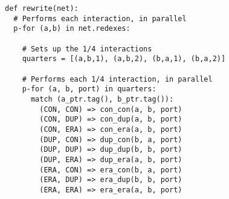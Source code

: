 \documentclass{article}
\begin{document}
\begin{lstlisting}
def rewrite(net):
  # Performs each interaction, in parallel
  p-for (a,b) in net.redexes:

    # Sets up the 1/4 interactions
    quarters = [(a,b,1), (a,b,2), (b,a,1), (b,a,2)]

    # Performs each 1/4 interaction, in parallel
    p-for (a, b, port) in quarters:
      match (a_ptr.tag(), b_ptr.tag()):
        (CON, CON) => con_con(a, b, port)
        (CON, DUP) => con_dup(a, b, port)
        (CON, ERA) => con_era(a, b, port)
        (DUP, CON) => dup_con(b, a, port)
        (DUP, DUP) => dup_dup(b, b, port)
        (DUP, ERA) => dup_era(a, b, port)
        (ERA, CON) => era_con(b, a, port)
        (ERA, DUP) => era_dup(b, b, port)
        (ERA, ERA) => era_era(a, b, port)
\end{lstlisting}
\end{document}
